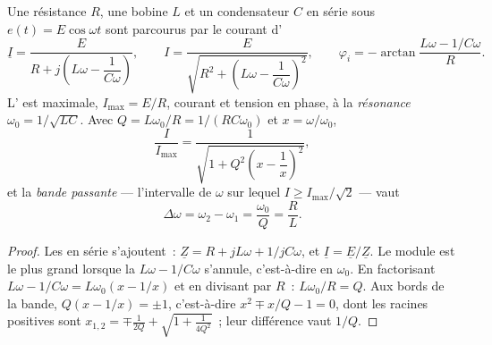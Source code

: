 \begin{theorem}\label{thm:b1:sinusoidal-impedance:resonance}
Une résistance $R$, une bobine $L$ et un condensateur $C$ en série sous
$e(t) = E\cos\omega t$ sont parcourus par le courant d'
\[
\underline I = \frac{E}{R + j\left(L\omega - \dfrac{1}{C\omega}\right)},
\qquad
I = \frac{E}{\sqrt{R^2 + \left(L\omega - \dfrac{1}{C\omega}\right)^2}},
\qquad
\varphi_i = -\arctan\frac{L\omega - 1/C\omega}{R} .
\]
L' est maximale, $I_{\max} = E/R$, courant et tension en phase,
à la \emph{résonance} $\omega_0 = 1/\sqrt{LC}$. Avec
$Q = L\omega_0/R = 1/(RC\omega_0)$ et $x = \omega/\omega_0$,
\[
\frac{I}{I_{\max}} = \frac{1}{\sqrt{1 + Q^2\left(x - \dfrac1x\right)^2}} ,
\]
et la \emph{bande passante} --- l'intervalle de $\omega$ sur lequel
$I \geq I_{\max}/\sqrt2$ --- vaut
\[
\Delta\omega = \omega_2 - \omega_1 = \frac{\omega_0}{Q} = \frac{R}{L} .
\]
\end{theorem}

\begin{proof}
Les  en série s'ajoutent~: $\underline Z = R + jL\omega + 1/jC\omega$,
et $\underline I = \underline E/\underline Z$. Le module est le plus
grand lorsque la  $L\omega - 1/C\omega$ s'annule, c'est-à-dire
en $\omega_0$. En factorisant $L\omega - 1/C\omega = L\omega_0(x - 1/x)$
et en divisant par $R$~: $L\omega_0/R = Q$. Aux bords de la bande,
$Q(x - 1/x) = \pm 1$, c'est-à-dire
$x^2 \mp x/Q - 1 = 0$, dont les racines positives sont $x_{1,2} = \mp\frac{1}{2Q}
+ \sqrt{1 + \frac{1}{4Q^2}}$~; leur différence vaut $1/Q$.
\end{proof}

